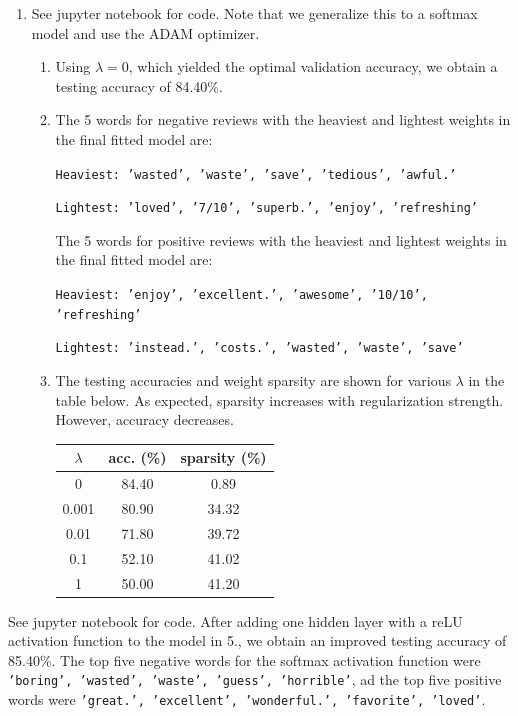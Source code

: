 \documentclass[submit]{harvardml}
\begin{document}
\begin{enumerate}[label=(\alph*)]
	\item See jupyter notebook for code. Note that we generalize this to a softmax model and use the ADAM optimizer.
	\begin{enumerate}[label=(\roman*)]
		\item Using $\lambda = 0$, which yielded the optimal validation accuracy, we obtain a testing accuracy of 84.40\%.
		
		\item The 5 words for negative reviews with the heaviest and lightest weights in the final fitted model are:
		
		\texttt{Heaviest: 'wasted', 'waste', 'save', 'tedious', 'awful.' }
		
		\texttt{Lightest: 'loved', '7/10', 'superb.', 'enjoy', 'refreshing' }
		
		The 5 words for positive reviews with the heaviest and lightest weights in the final fitted model are:
		
		\texttt{Heaviest: 'enjoy', 'excellent.', 'awesome', '10/10', 'refreshing' }
		
		\texttt{Lightest: 'instead.', 'costs.', 'wasted', 'waste', 'save' }
		
		\item The testing accuracies and weight sparsity are shown for various $\lambda$ in the table below. As expected, sparsity increases with regularization strength. However, accuracy decreases.
		
		\centering
		\begin{tabular}{c|c|c}
			$\lambda$ & acc. (\%) & sparsity (\%) \\ \hline
			0 		& 84.40 & 0.89 \\
			0.001 	& 80.90 & 34.32 \\
			0.01 	& 71.80 & 39.72 \\
			0.1 	& 52.10 & 41.02 \\
			1 		& 50.00 & 41.20
		\end{tabular}
	
	\end{enumerate}
\end{enumerate}

\newpage

See jupyter notebook for code. After adding one hidden layer with a reLU activation function to the model in 5., we obtain an improved testing accuracy of 85.40\%. The top five negative words for the softmax activation function were \texttt{'boring', 'wasted', 'waste', 'guess', 'horrible'}, ad the top five positive words were \texttt{'great.', 'excellent', 'wonderful.', 'favorite', 'loved'}. 
\end{document}
